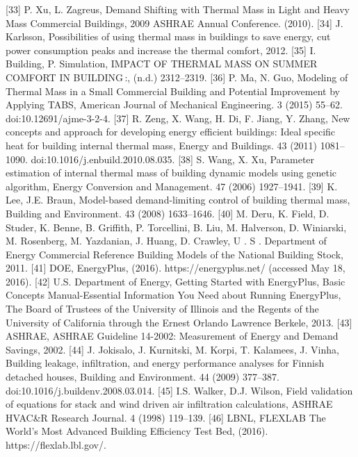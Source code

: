 [33]	P. Xu, L. Zagreus, Demand Shifting with Thermal Mass in Light and Heavy Mass Commercial Buildings, 2009 ASHRAE Annual Conference. (2010).
[34]	J. Karlsson, Possibilities of using thermal mass in buildings to save energy, cut power consumption peaks and increase the thermal comfort, 2012.
[35]	I. Building, P. Simulation, IMPACT OF THERMAL MASS ON SUMMER COMFORT IN BUILDING :, (n.d.) 2312–2319.
[36]	P. Ma, N. Guo, Modeling of Thermal Mass in a Small Commercial Building and Potential Improvement by Applying TABS, American Journal of Mechanical Engineering. 3 (2015) 55–62. doi:10.12691/ajme-3-2-4.
[37]	R. Zeng, X. Wang, H. Di, F. Jiang, Y. Zhang, New concepts and approach for developing energy efficient buildings: Ideal specific heat for building internal thermal mass, Energy and Buildings. 43 (2011) 1081–1090. doi:10.1016/j.enbuild.2010.08.035.
[38]	S. Wang, X. Xu, Parameter estimation of internal thermal mass of building dynamic models using genetic algorithm, Energy Conversion and Management. 47 (2006) 1927–1941.
[39]	K. Lee, J.E. Braun, Model-based demand-limiting control of building thermal mass, Building and Environment. 43 (2008) 1633–1646.
[40]	M. Deru, K. Field, D. Studer, K. Benne, B. Griffith, P. Torcellini, B. Liu, M. Halverson, D. Winiarski, M. Rosenberg, M. Yazdanian, J. Huang, D. Crawley, U . S . Department of Energy Commercial Reference Building Models of the National Building Stock, 2011.
[41]	DOE, EnergyPlus, (2016). https://energyplus.net/ (accessed May 18, 2016).
[42]	U.S. Department of Energy, Getting Started with EnergyPlus, Basic Concepts Manual-Essential Information You Need about Running EnergyPlus, The Board of Trustees of the University of Illinois and the Regents of the University of California through the Ernest Orlando Lawrence Berkele, 2013.
[43]	ASHRAE, ASHRAE Guideline 14-2002: Measurement of Energy and Demand Savings, 2002.
[44]	J. Jokisalo, J. Kurnitski, M. Korpi, T. Kalamees, J. Vinha, Building leakage, infiltration, and energy performance analyses for Finnish detached houses, Building and Environment. 44 (2009) 377–387. doi:10.1016/j.buildenv.2008.03.014.
[45]	I.S. Walker, D.J. Wilson, Field validation of equations for stack and wind driven air infiltration calculations, ASHRAE HVAC&R Research Journal. 4 (1998) 119–139.
[46]	LBNL, FLEXLAB The World’s Most Advanced Building Efficiency Test Bed, (2016). https://flexlab.lbl.gov/.

